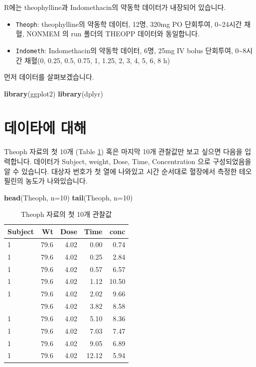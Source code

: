 \documentclass[12pt,]{krantz}
\newenvironment{Shaded}{\begin{snugshade}}{\end{snugshade}}
\newcommand{\DataTypeTok}[1]{\textcolor[rgb]{0.13,0.29,0.53}{#1}}
\newcommand{\DecValTok}[1]{\textcolor[rgb]{0.00,0.00,0.81}{#1}}
\newcommand{\KeywordTok}[1]{\textcolor[rgb]{0.13,0.29,0.53}{\textbf{#1}}}
\newcommand{\NormalTok}[1]{#1}
\providecommand{\tightlist}{%
  \setlength{\itemsep}{0pt}\setlength{\parskip}{0pt}}
\begin{document}
R에는 theophylline과 Indomethacin의 약동학 데이터가 내장되어 있습니다.

\begin{itemize}
\tightlist
\item
  \texttt{Theoph}: theophylline의 약동학 데이터, 12명, 320mg PO 단회투여, 0\textasciitilde24시간 채혈, NONMEM 의 run 폴더의 THEOPP 데이터와 동일합니다.
\item
  \texttt{Indometh}: Indomethacin의 약동학 데이터, 6명, 25mg IV bolus 단회투여, 0\textasciitilde8시간 채혈(0, 0.25, 0.5, 0.75, 1, 1.25, 2, 3, 4, 5, 6, 8 h)
\end{itemize}

먼저 데이터를 살펴보겠습니다.

\begin{Shaded}
\begin{Highlighting}[]
\KeywordTok{library}\NormalTok{(ggplot2)}
\KeywordTok{library}\NormalTok{(dplyr)}
\end{Highlighting}
\end{Shaded}

\hypertarget{TheophData}{%
\section{데이타에 대해}\label{TheophData}}

Theoph 자료의 첫 10개 (Table \ref{tab:head}) 혹은 마지막 10개 관찰값만 보고 싶으면 다음을 입력합니다.
데이터가 Subject, weight, Dose, Time, Concentration 으로 구성되었음을 알 수 있습니다. 대상자 번호가 첫 열에 나와있고 시간 순서대로 혈장에서 측정한 테오필린의 농도가 나와있습니다.

\begin{Shaded}
\begin{Highlighting}[]
\KeywordTok{head}\NormalTok{(Theoph, }\DataTypeTok{n=}\DecValTok{10}\NormalTok{)}
\KeywordTok{tail}\NormalTok{(Theoph, }\DataTypeTok{n=}\DecValTok{10}\NormalTok{)}
\end{Highlighting}
\end{Shaded}

\begin{table}

\caption{\label{tab:head}Theoph 자료의 첫 10개 관찰값}
\centering
\begin{tabular}[t]{lrrrr}
\toprule
Subject & Wt & Dose & Time & conc\\
\midrule
1 & 79.6 & 4.02 & 0.00 & 0.74\\
1 & 79.6 & 4.02 & 0.25 & 2.84\\
1 & 79.6 & 4.02 & 0.57 & 6.57\\
1 & 79.6 & 4.02 & 1.12 & 10.50\\
1 & 79.6 & 4.02 & 2.02 & 9.66\\
\addlinespace
1 & 79.6 & 4.02 & 3.82 & 8.58\\
1 & 79.6 & 4.02 & 5.10 & 8.36\\
1 & 79.6 & 4.02 & 7.03 & 7.47\\
1 & 79.6 & 4.02 & 9.05 & 6.89\\
1 & 79.6 & 4.02 & 12.12 & 5.94\\
\bottomrule
\end{tabular}
\end{table}
\end{document}
